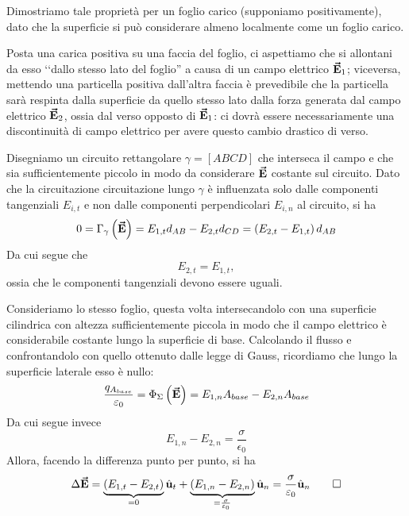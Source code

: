 \begin{demonstration}
	Dimostriamo tale proprietà per un foglio carico (supponiamo positivamente), dato che la superficie si può considerare almeno localmente come un foglio 
	carico.
	
	Posta una carica positiva su una faccia del foglio, ci aspettiamo che si allontani da esso ‘‘dallo stesso lato del foglio'' a causa di un campo elettrico $\vb*{\va{E}}_1$; viceversa, mettendo una particella positiva dall'altra faccia è prevedibile che la particella sarà respinta dalla superficie da quello stesso lato dalla forza generata dal campo elettrico $\vb*{\va{E}}_2$, ossia dal verso opposto di $\vb*{\va{E}}_1$: ci dovrà essere necessariamente una discontinuità di campo elettrico per avere questo cambio drastico di verso.
	
	Disegniamo un circuito rettangolare $\gamma=[ABCD]$ che interseca il campo e che sia sufficientemente piccolo in modo da considerare $\vb*{\va{E}}$ costante sul circuito. Dato che la circuitazione circuitazione lungo $\gamma$ è influenzata solo dalle componenti tangenziali $E_{i,t}$ e non dalle componenti perpendicolari $E_{i,n}$ al circuito, si ha
	\begin{equation*}
		0=\Gamma_{\gamma}\left(\vb*{\va{E}}\right)=E_{1,t}d_{AB}-E_{2,t}d_{CD}=\left(E_{2,t}-E_{1,t}\right)d_{AB}
	\end{equation*}
Da cui segue che
\begin{equation*}
	E_{2,t}=E_{1,t},
\end{equation*}
ossia che le componenti tangenziali devono essere uguali.

Consideriamo lo stesso foglio, questa volta intersecandolo con una superficie cilindrica con altezza sufficientemente piccola in modo che  il campo elettrico è considerabile costante lungo la superficie di base. Calcolando il flusso e confrontandolo con quello ottenuto dalle legge di Gauss, ricordiamo che lungo la superficie laterale esso è nullo:
\begin{equation*}
	\frac{q_{A_{base}}}{\varepsilon_0}=\Phi_{\Sigma}\left(\vb*{\va{E}}\right)=E_{1,n}A_{base}-E_{2,n}A_{base}
\end{equation*}
Da cui segue invece
\begin{equation*}
	E_{1,n}-E_{2,n}=\frac{\sigma}{\epsilon_0}
\end{equation*}
Allora, facendo la differenza punto per punto, si ha
\begin{equation*}
	\Delta\vb*{\va{E}}=\underbrace{\left(E_{1,t}-E_{2,t}\right)}_{=0}\hat{\mathbf{u}}_t+\underbrace{\left(E_{1,n}-E_{2,n}\right)}_{=\frac{\sigma}{\varepsilon_0}}\hat{\mathbf{u}}_n=\frac{\sigma}{\varepsilon_0}\hat{\mathbf{u}}_n\qedhere
\end{equation*}
\end{demonstration}

